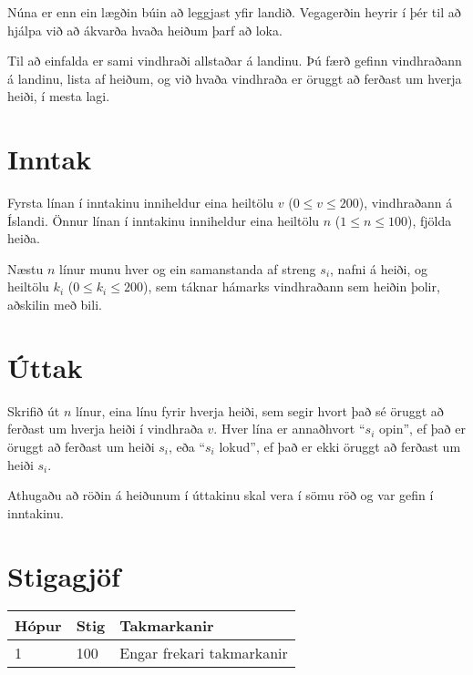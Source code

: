 
Núna er enn ein lægðin búin að leggjast yfir landið. Vegagerðin heyrir í þér til að hjálpa við að ákvarða hvaða heiðum þarf að loka.

Til að einfalda er sami vindhraði allstaðar á landinu. Þú færð gefinn vindhraðann á landinu, lista af heiðum, og við hvaða vindhraða er öruggt að ferðast um hverja heiði, í mesta lagi.


\section*{Inntak}
Fyrsta línan í inntakinu inniheldur eina heiltölu $v$ ($0 \leq v \leq 200$), vindhraðann á Íslandi.
Önnur línan í inntakinu inniheldur eina heiltölu $n$ ($1 \leq n \leq
    100$), fjölda heiða.

Næstu $n$ línur munu hver og ein samanstanda af streng $s_i$, nafni á heiði, og heiltölu $k_i$ ($0 \leq k_i \leq 200$), sem táknar hámarks vindhraðann sem heiðin þolir, aðskilin með bili.

\section*{Úttak}

Skrifið út $n$ línur, eina línu fyrir hverja heiði, sem segir hvort það sé öruggt að ferðast um hverja heiði í vindhraða $v$.
Hver lína er annaðhvort ``$s_i$ opin'', ef það er öruggt að ferðast um heiði $s_i$, eða ``$s_i$ lokud'', ef það er ekki öruggt að ferðast um heiði $s_i$.

Athugaðu að röðin á heiðunum í úttakinu skal vera í sömu röð og var gefin í inntakinu.

\section*{Stigagjöf}
\begin{tabular}{|l|l|l|}
    \hline
    Hópur & Stig & Takmarkanir               \\ \hline
    1     & 100  & Engar frekari takmarkanir \\ \hline
\end{tabular}


